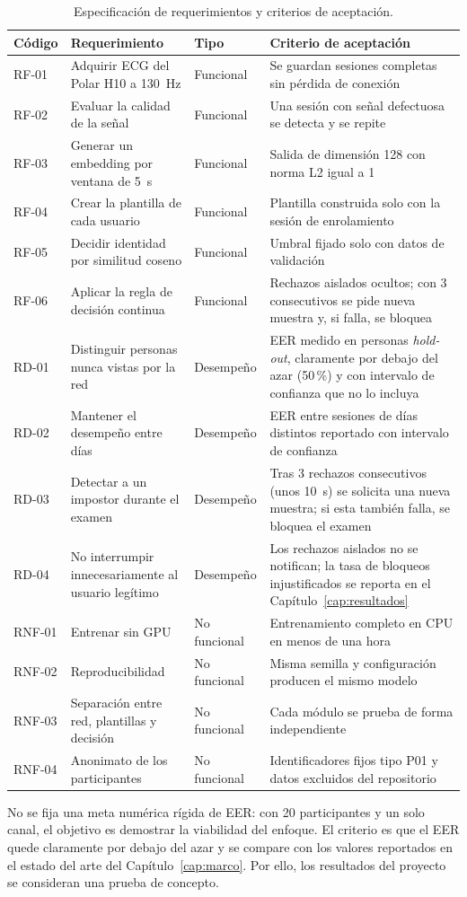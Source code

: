 \begin{table}[htbp]
\centering
\caption{Especificación de requerimientos y criterios de aceptación.}
\label{tab:requerimientos}
\small
\begin{tabularx}{\textwidth}{l X l X}
\toprule
\textbf{Código} & \textbf{Requerimiento} & \textbf{Tipo} & \textbf{Criterio de aceptación} \\
\midrule
RF-01 & Adquirir ECG del Polar H10 a 130~Hz & Funcional & Se guardan sesiones completas sin pérdida de conexión \\
RF-02 & Evaluar la calidad de la señal & Funcional & Una sesión con señal defectuosa se detecta y se repite \\
RF-03 & Generar un embedding por ventana de 5~s & Funcional & Salida de dimensión 128 con norma L2 igual a 1 \\
RF-04 & Crear la plantilla de cada usuario & Funcional & Plantilla construida solo con la sesión de enrolamiento \\
RF-05 & Decidir identidad por similitud coseno & Funcional & Umbral fijado solo con datos de validación \\
RF-06 & Aplicar la regla de decisión continua & Funcional & Rechazos aislados ocultos; con 3 consecutivos se pide nueva muestra y, si falla, se bloquea \\
RD-01 & Distinguir personas nunca vistas por la red & Desempeño & EER medido en personas \emph{hold-out}, claramente por debajo del azar (50\,\%) y con intervalo de confianza que no lo incluya \\
RD-02 & Mantener el desempeño entre días & Desempeño & EER entre sesiones de días distintos reportado con intervalo de confianza \\
RD-03 & Detectar a un impostor durante el examen & Desempeño & Tras 3 rechazos consecutivos (unos 10~s) se solicita una nueva muestra; si esta también falla, se bloquea el examen \\
RD-04 & No interrumpir innecesariamente al usuario legítimo & Desempeño & Los rechazos aislados no se notifican; la tasa de bloqueos injustificados se reporta en el Capítulo~\ref{cap:resultados} \\
RNF-01 & Entrenar sin GPU & No funcional & Entrenamiento completo en CPU en menos de una hora \\
RNF-02 & Reproducibilidad & No funcional & Misma semilla y configuración producen el mismo modelo \\
RNF-03 & Separación entre red, plantillas y decisión & No funcional & Cada módulo se prueba de forma independiente \\
RNF-04 & Anonimato de los participantes & No funcional & Identificadores fijos tipo P01 y datos excluidos del repositorio \\
\bottomrule
\end{tabularx}
\end{table}

No se fija una meta numérica rígida de EER: con 20 participantes y un solo canal, el objetivo es demostrar la viabilidad del enfoque. El criterio es que el EER quede claramente por debajo del azar y se compare con los valores reportados en el estado del arte del Capítulo~\ref{cap:marco}. Por ello, los resultados del proyecto se consideran una prueba de concepto.

